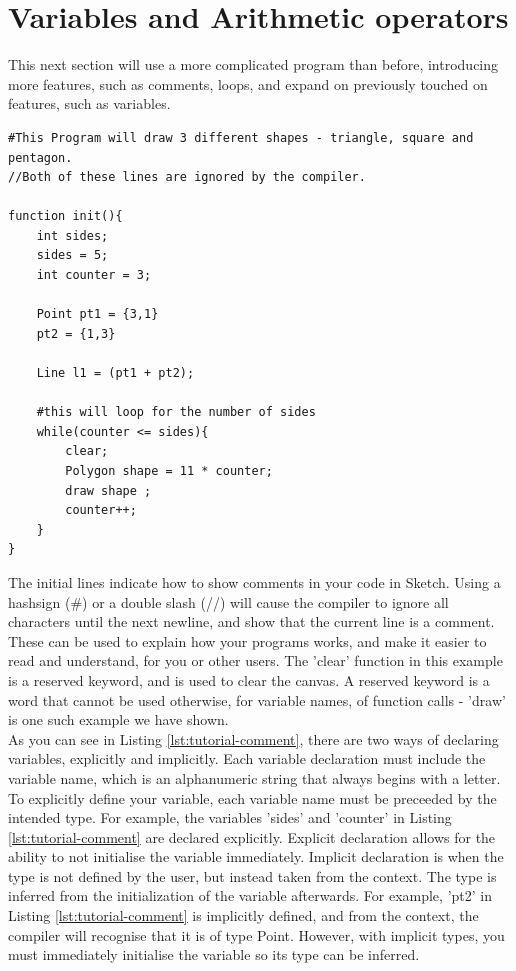 \documentclass{l3proj}
\begin{document}
\section{Variables and Arithmetic operators}
\label{vars}
This next section will use a more complicated program than before, introducing more features, such as comments, loops, and expand on previously touched on features, such as variables.
\begin{lstlisting}[caption={Comments and Point Addition},label={lst:tutorial-comment}]
#This Program will draw 3 different shapes - triangle, square and pentagon.
//Both of these lines are ignored by the compiler.

function init(){
	int sides;
	sides = 5;
    int counter = 3;
    
    Point pt1 = {3,1}
    pt2 = {1,3}
    
    Line l1 = (pt1 + pt2);
    
    #this will loop for the number of sides
    while(counter <= sides){
        clear;
        Polygon shape =	11 * counter;
        draw shape ;
        counter++;
    }
}
\end{lstlisting}
The initial lines indicate how to show comments in your code in Sketch. Using a hashsign (\#) or a double slash (//) will cause the compiler to ignore all characters until the next newline, and show that the current line is a comment. These can be used to explain how your programs works, and make it easier to read and understand, for you or other users. The 'clear' function in this example is a reserved keyword, and is used to clear the canvas. A reserved keyword is a word that cannot be used otherwise, for variable names, of function calls - 'draw' is one such example we have shown.
\\ [12pt]
As you can see in Listing \ref{lst:tutorial-comment}, there are two ways of declaring variables, explicitly and implicitly. Each variable declaration must include the variable name, which is an alphanumeric string that always begins with a letter. To explicitly define your variable, each variable name must be preceeded by the intended type. For example, the variables 'sides' and 'counter' in Listing \ref{lst:tutorial-comment} are declared explicitly. Explicit declaration allows for the ability to not initialise the variable immediately. Implicit declaration is when the type is not defined by the user, but instead taken from the context. The type is inferred from the initialization of the variable afterwards. For example, 'pt2' in Listing \ref{lst:tutorial-comment} is implicitly defined, and from the context, the compiler will recognise that it is of type Point. However, with implicit types, you must immediately initialise the variable so its type can be inferred.
\end{document}
